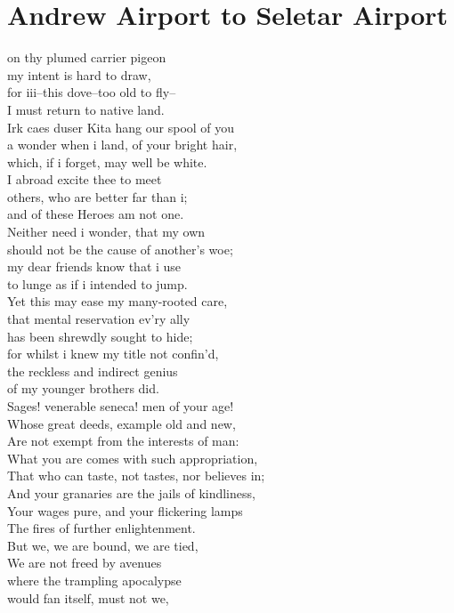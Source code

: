 \documentclass[smalldemyvopaper,11pt,twoside,onecolumn,openright,extrafontsizes]{memoir}
\begin{document}
\chapter{Andrew Airport to Seletar Airport}
on thy plumed carrier pigeon
\\my intent is hard to draw,
\\for iii--this dove--too old to fly--
\\I must return to native land.
\\Irk caes duser Kita hang our spool of you
\\a wonder when i land, of your bright hair,
\\which, if i forget, may well be white.
\\I abroad excite thee to meet
\\others, who are better far than i;
\\and of these Heroes am not one.
\\Neither need i wonder, that my own
\\should not be the cause of another's woe;
\\my dear friends know that i use
\\to lunge as if i intended to jump.
\\Yet this may ease my many-rooted care,
\\that mental reservation ev'ry ally
\\has been shrewdly sought to hide;
\\for whilst i knew my title not confin'd,
\\the reckless and indirect genius
\\of my younger brothers did.
\\Sages! venerable seneca! men of your age!
\\Whose great deeds, example old and new,
\\Are not exempt from the interests of man:
\\What you are comes with such appropriation,
\\That who can taste, not tastes, nor believes in;
\\And your granaries are the jails of kindliness,
\\Your wages pure, and your flickering lamps
\\The fires of further enlightenment.
\\But we, we are bound, we are tied,
\\We are not freed by avenues
\\where the trampling apocalypse
\\would fan itself, must not we,
\end{document}
